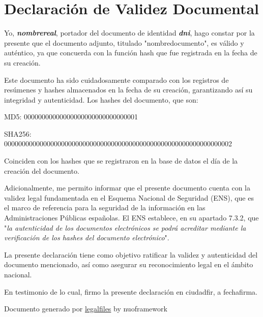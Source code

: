 \documentclass[
]{article}
\author{}
\date{}
\begin{document}
\hypertarget{declaraciuxf3n-de-validez-documental}{%
\section{\texorpdfstring{\textbf{Declaración de Validez
Documental}}{Declaración de Validez Documental}}\label{declaraciuxf3n-de-validez-documental}}

Yo, \emph{\textbf{nombrereal}}, portador del documento de identidad
\emph{\textbf{dni}}, hago constar por la presente que el documento
adjunto, titulado "nombredocumento", es válido y auténtico, ya que
concuerda con la función hash que fue registrada en la fecha de su
creación.

Este documento ha sido cuidadosamente comparado con los registros de
resúmenes y hashes almacenados en la fecha de su creación, garantizando
así su integridad y autenticidad. Los hashes del documento, que son:

MD5: 00000000000000000000000000000001

SHA256: 0000000000000000000000000000000000000000000000000000000000000002

Coinciden con los hashes que se registraron en la base de datos el día
de la creación del documento.

Adicionalmente, me permito informar que el presente documento cuenta con
la validez legal fundamentada en el Esquema Nacional de Seguridad (ENS),
que es el marco de referencia para la seguridad de la información en las
Administraciones Públicas españolas. El ENS establece, en su apartado
7.3.2, que "\emph{la autenticidad de los documentos electrónicos se
podrá acreditar mediante la verificación de los hashes del documento
electrónico}".

La presente declaración tiene como objetivo ratificar la validez y
autenticidad del documento mencionado, así como asegurar su
reconocimiento legal en el ámbito nacional.

En testimonio de lo cual, firmo la presente declaración en ciudadfir, a
fechafirma.

Documento generado por
\href{https://github.com/nuoframework/legalfiles}{legalfiles} by
nuoframework
\end{document}
